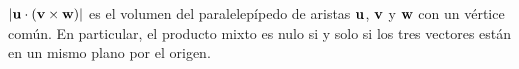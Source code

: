 \begin{proposicion}[Volumen]\label{prop:volumen}
$\lvert\mathbf{u}\cdot(\mathbf{v}\times\mathbf{w})\rvert$ es el volumen del paralelepípedo de aristas $\mathbf{u}$, $\mathbf{v}$ y $\mathbf{w}$ con un vértice común. En particular, el producto mixto es nulo si y solo si los tres vectores están en un mismo plano por el origen.
\end{proposicion}

\addtocounter{definicion}{1}%

\addtocounter{definicion}{1}%

\addtocounter{definicion}{1}%

